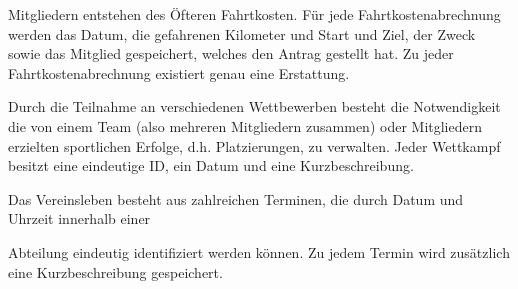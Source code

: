 \documentclass{bschlangaul-aufgabe}
\begin{document}
Mitgliedern entstehen des Öfteren Fahrtkosten. Für jede
Fahrtkostenabrechnung werden das Datum, die gefahrenen Kilometer und
Start und Ziel, der Zweck sowie das Mitglied gespeichert, welches den
Antrag gestellt hat. Zu jeder Fahrtkostenabrechnung existiert genau eine
Erstattung.

Durch die Teilnahme an verschiedenen Wettbewerben besteht die
Notwendigkeit die von einem Team (also mehreren Mitgliedern zusammen)
oder Mitgliedern erzielten sportlichen Erfolge, d.h. Platzierungen, zu
verwalten. Jeder Wettkampf besitzt eine eindeutige ID, ein Datum und
eine Kurzbeschreibung.

Das Vereinsleben besteht aus zahlreichen Terminen, die durch Datum und
Uhrzeit innerhalb einer

Abteilung eindeutig identifiziert werden können. Zu jedem Termin wird
zusätzlich eine Kurzbeschreibung gespeichert.
\end{document}
